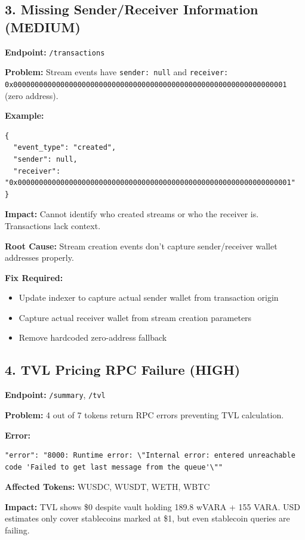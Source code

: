 \documentclass[11pt,a4paper]{article}
\begin{document}
\subsection{3. Missing Sender/Receiver Information (MEDIUM)}

\textbf{Endpoint:} \texttt{/transactions}

\textbf{Problem:} Stream events have \texttt{sender: null} and \texttt{receiver: 0x0000000000000000000000000000000000000000000000000000000000000001} (zero address).

\textbf{Example:}
\begin{lstlisting}
{
  "event_type": "created",
  "sender": null,
  "receiver": "0x0000000000000000000000000000000000000000000000000000000000000001"
}
\end{lstlisting}

\textbf{Impact:} Cannot identify who created streams or who the receiver is. Transactions lack context.

\textbf{Root Cause:} Stream creation events don't capture sender/receiver wallet addresses properly.

\textbf{Fix Required:}
\begin{itemize}
    \item Update indexer to capture actual sender wallet from transaction origin
    \item Capture actual receiver wallet from stream creation parameters
    \item Remove hardcoded zero-address fallback
\end{itemize}

\subsection{4. TVL Pricing RPC Failure (HIGH)}

\textbf{Endpoint:} \texttt{/summary}, \texttt{/tvl}

\textbf{Problem:} 4 out of 7 tokens return RPC errors preventing TVL calculation.

\textbf{Error:}
\begin{lstlisting}
"error": "8000: Runtime error: \"Internal error: entered unreachable code 'Failed to get last message from the queue'\""
\end{lstlisting}

\textbf{Affected Tokens:} WUSDC, WUSDT, WETH, WBTC

\textbf{Impact:} TVL shows \$0 despite vault holding 189.8 wVARA + 155 VARA. USD estimates only cover stablecoins marked at \$1, but even stablecoin queries are failing.
\end{document}

